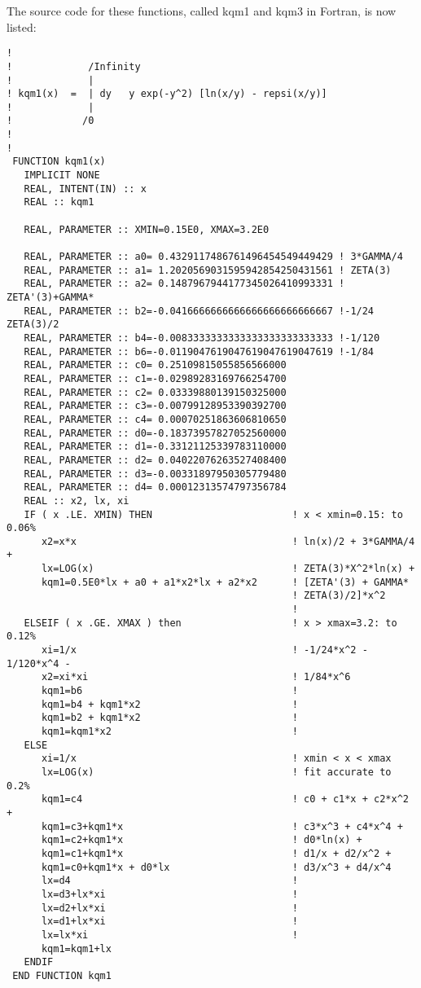 \documentclass[preprint,12pt,eqsecnum,nofootinbib,amsmath,amssymb]{revtex4}
\begin{document}
\vskip0.3cm 
\noindent
The source code for these functions, called kqm1 and kqm3 in Fortran,
is now listed:

{
\baselineskip12pt
\begin{verbatim}
!
!             /Infinity
!             |
! kqm1(x)  =  | dy   y exp(-y^2) [ln(x/y) - repsi(x/y)]
!             |
!            /0
!
!
 FUNCTION kqm1(x)  
   IMPLICIT NONE
   REAL, INTENT(IN) :: x
   REAL :: kqm1

   REAL, PARAMETER :: XMIN=0.15E0, XMAX=3.2E0 

   REAL, PARAMETER :: a0= 0.4329117486761496454549449429 ! 3*GAMMA/4
   REAL, PARAMETER :: a1= 1.2020569031595942854250431561 ! ZETA(3)
   REAL, PARAMETER :: a2= 0.1487967944177345026410993331 ! ZETA'(3)+GAMMA*
   REAL, PARAMETER :: b2=-0.0416666666666666666666666667 !-1/24  ZETA(3)/2
   REAL, PARAMETER :: b4=-0.0083333333333333333333333333 !-1/120
   REAL, PARAMETER :: b6=-0.0119047619047619047619047619 !-1/84
   REAL, PARAMETER :: c0= 0.25109815055856566000
   REAL, PARAMETER :: c1=-0.02989283169766254700
   REAL, PARAMETER :: c2= 0.03339880139150325000
   REAL, PARAMETER :: c3=-0.00799128953390392700
   REAL, PARAMETER :: c4= 0.00070251863606810650
   REAL, PARAMETER :: d0=-0.18373957827052560000
   REAL, PARAMETER :: d1=-0.33121125339783110000
   REAL, PARAMETER :: d2= 0.04022076263527408400
   REAL, PARAMETER :: d3=-0.00331897950305779480
   REAL, PARAMETER :: d4= 0.00012313574797356784
   REAL :: x2, lx, xi
   IF ( x .LE. XMIN) THEN                        ! x < xmin=0.15: to 0.06%
      x2=x*x                                     ! ln(x)/2 + 3*GAMMA/4 +
      lx=LOG(x)                                  ! ZETA(3)*X^2*ln(x) +
      kqm1=0.5E0*lx + a0 + a1*x2*lx + a2*x2      ! [ZETA'(3) + GAMMA*
                                                 ! ZETA(3)/2]*x^2
                                                 !
   ELSEIF ( x .GE. XMAX ) then                   ! x > xmax=3.2: to 0.12%
      xi=1/x                                     ! -1/24*x^2 - 1/120*x^4 -
      x2=xi*xi                                   ! 1/84*x^6
      kqm1=b6                                    !
      kqm1=b4 + kqm1*x2                          !
      kqm1=b2 + kqm1*x2                          !
      kqm1=kqm1*x2                               !
   ELSE
      xi=1/x                                     ! xmin < x < xmax
      lx=LOG(x)                                  ! fit accurate to 0.2%
      kqm1=c4                                    ! c0 + c1*x + c2*x^2 +
      kqm1=c3+kqm1*x                             ! c3*x^3 + c4*x^4 +
      kqm1=c2+kqm1*x                             ! d0*ln(x) +
      kqm1=c1+kqm1*x                             ! d1/x + d2/x^2 +
      kqm1=c0+kqm1*x + d0*lx                     ! d3/x^3 + d4/x^4
      lx=d4                                      !
      lx=d3+lx*xi                                !
      lx=d2+lx*xi                                !
      lx=d1+lx*xi                                !
      lx=lx*xi                                   !
      kqm1=kqm1+lx
   ENDIF
 END FUNCTION kqm1


\end{verbatim}}
\end{document}
